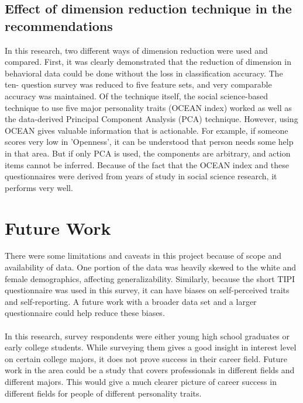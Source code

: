 \documentclass[conference]{IEEEtran}
\begin{document}
\subsection{Effect of dimension reduction technique in the recommendations} \label{subsubsec5}
In this research, two different ways of dimension reduction were used and
compared. First, it was clearly demonstrated that the reduction of dimension in
behavioral data could be done without the loss in classification accuracy. The ten-
question survey was reduced to five feature sets, and very comparable accuracy was
maintained. Of the technique itself, the social science-based technique to use five major
personality traits (OCEAN index) worked as well as the data-derived Principal
Component Analysis (PCA) technique. However, using OCEAN gives valuable
information that is actionable. For example, if someone scores very low in ’Openness’,
it can be understood that person needs some help in that area. But if only PCA is used,
the components are arbitrary, and action items cannot be inferred. Because of the fact
that the OCEAN index and these questionnaires were derived from years of study in
social science research, it performs very well.




\section{Future Work}\label{sec6}
There were some limitations and caveats in this project because of scope and
availability of data. One portion of the data was heavily skewed to the white and female
demographics, affecting generalizability. Similarly, because the short TIPI
questionnaire was used in this survey, it can have biases on self-perceived traits and
self-reporting. A future work with a broader data set and a larger questionnaire could
help reduce these biases. \\ \\ 
In this research, survey respondents were either young high school graduates or
early college students. While surveying them gives a good insight in interest level on
certain college majors, it does not prove success in their career field. Future work in the
area could be a study that covers professionals in different fields and different majors.
This would give a much clearer picture of career success in different fields for people of
different personality traits.
\end{document}
